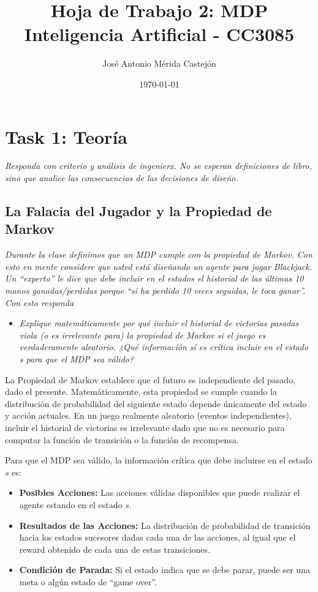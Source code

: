 \documentclass[11pt]{article}
\title{\textbf{Hoja de Trabajo 2: MDP} \vspace{1em}\\
Inteligencia Artificial - CC3085}
\author{José Antonio Mérida Castejón}
\date{\today}
\begin{document}
\maketitle

\section*{Task 1: Teoría}
\noindent\textit{Responda con criterio y análisis de ingenierx. No se esperan definiciones de libro, sino que analice las
consecuencias de las decisiones de diseño.}

\subsection*{La Falacia del Jugador y la Propiedad de Markov}
\noindent\textit{Durante la clase definimos que un MDP cumple con la propiedad de Markov. Con esto en mente
 considere que usted está diseñando un agente para jugar Blackjack. Un ``experto'' le dice que debe
 incluir en el estados el historial de las últimas 10 manos ganadas/perdidas porque ``si ha perdido
 10 veces seguidas, le toca ganar''. Con esto responda}

 \begin{itemize}
 \item\textit{Explique matemáticamente por qué incluir el historial de victorias pasadas viola (o es irrelevante
para) la propiedad de Markov si el juego es verdaderamente aleatorio. ¿Qué información sí es
crítica incluir en el estado s para que el MDP sea válido?}
\end{itemize}

\noindent La Propiedad de Markov establece que el futuro es independiente del pasado, dado el presente. Matemáticamente, esta propiedad se cumple
cuando la distribución de probabilidad del siguiente estado depende únicamente del estado y acción actuales. En un juego realmente
aleatorio (eventos independientes), incluir el historial de victorias es irrelevante dado que no es necesario para computar la función
de transición o la función de recompensa. 

\vspace{0.5em}

\noindent Para que el MDP sea válido, la información crítica que debe incluirse en el estado $s$ es:
\begin{itemize}
    \item \textbf{Posibles Acciones:} Las acciones válidas disponibles que puede realizar el agente estando en el estado $s$.
    
    \item \textbf{Resultados de las Acciones:} La distribución de probabilidad de transición hacia los estados sucesores dadas cada
      una de las acciones, al igual que el reward obtenido de cada una de estas transiciones.
    
    \item \textbf{Condición de Parada:} Si el estado indica que se debe parar, puede ser una meta o algún estado de ``game over''.
\end{itemize}
\end{document}
